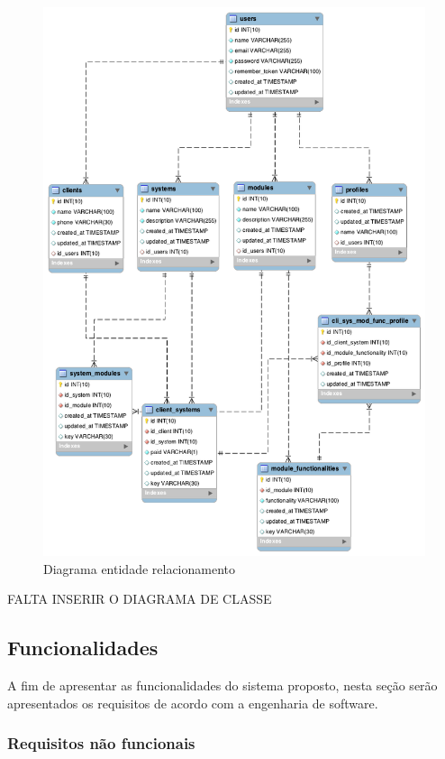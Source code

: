 \begin{figure}
	\label{fig:DER}
	\includegraphics[width=1\textwidth]{img/DER}
	\caption{Diagrama entidade relacionamento}
\end{figure}


FALTA INSERIR O DIAGRAMA DE CLASSE


\subsection{Funcionalidades}


A fim de apresentar as funcionalidades do sistema proposto, nesta seção serão apresentados os requisitos de acordo com a engenharia de software.


\subsubsection{Requisitos não funcionais}


